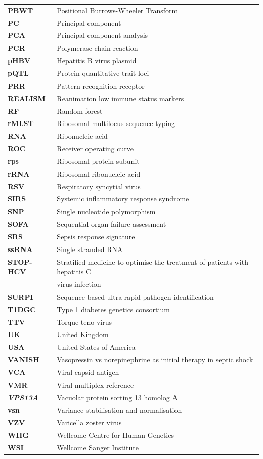 \begin{longtable}[l]{l l}
		\textbf{PBWT} & Positional Burrows-Wheeler Transform\\
		\textbf{PC} & Principal component\\
		\textbf{PCA} & Principal component analysis\\
		\textbf{PCR} & Polymerase chain reaction\\
		\textbf{pHBV} & Hepatitis B virus plasmid\\
		\textbf{pQTL} & Protein quantitative trait loci\\
		\textbf{PRR} & Pattern recognition receptor\\
		\textbf{REALISM} & Reanimation low immune status markers\\
		\textbf{RF} & Random forest\\
		\textbf{rMLST} & Ribosomal multilocus sequence typing\\
		\textbf{RNA} & Ribonucleic acid\\
		\textbf{ROC} & Receiver operating curve\\
		\textbf{rps} & Ribosomal protein subunit\\
		\textbf{rRNA} & Ribosomal ribonucleic acid\\
		\textbf{RSV} & Respiratory syncytial virus\\
		\textbf{SIRS} & Systemic inflammatory response syndrome\\
		\textbf{SNP} & Single nucleotide polymorphism\\
		\textbf{SOFA} & Sequential organ failure assessment\\
		\textbf{SRS} & Sepsis response signature\\
		\textbf{ssRNA} & Single stranded RNA\\
		\textbf{STOP-HCV} & Stratified medicine to optimise the treatment of patients with hepatitis C\\& virus infection\\
		\textbf{SURPI} & Sequence-based ultra-rapid pathogen identification\\
		\textbf{T1DGC} & Type 1 diabetes genetics consortium\\
		\textbf{TTV} & Torque teno virus\\
		\textbf{UK} & United Kingdom\\
		\textbf{USA} & United States of America\\
		\textbf{VANISH} & Vasopressin vs norepinephrine as initial therapy in septic shock\\
		\textbf{VCA} & Viral capsid antigen\\
		\textbf{VMR} & Viral multiplex reference\\
		\textit{\textbf{VPS13A}} & Vacuolar protein sorting 13 homolog A\\
		\textbf{vsn} & Variance stabilisation and normalisation\\
		\textbf{VZV} & Varicella zoster virus\\
		\textbf{WHG} & Wellcome Centre for Human Genetics\\
		\textbf{WSI} & Wellcome Sanger Institute\\
		
		
		

\end{longtable}